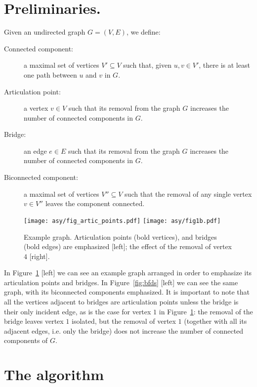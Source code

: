 \documentclass{llncs}
\begin{document}
\section{Preliminaries.}
\label{sec:prelim}
Given an undirected graph $G=(V,E)$, we define:
\begin{description}
	\item[Connected component:] a maximal set of vertices $V'\subseteq V$ such that, given $u,v\in V'$, there is at least one path between $u$ and $v$ in $G$. 
	\item[Articulation point:] a vertex $v\in V$ such that its removal from the graph $G$ increases the number of connected components in $G$. 
	\item[Bridge:] an edge $e\in E$ such that its removal from the graph $G$ increases the number of connected components in $G$. 
	\item[Biconnected component:] a maximal set of vertices $V''\subseteq V$ such that the removal of any single vertex $v\in V''$ leaves the component connected.
\end{description}

\begin{figure}[t!]
	\texttt{[image: asy/fig\_artic\_points.pdf]}\hfill \raisebox{1cm}{$\longrightarrow$} \hfill
	\texttt{[image: asy/fig1b.pdf]}
	\caption{Example graph. Articulation points (bold vertices), and bridges (bold edges) are emphasized [left]; the effect of the removal of vertex $4$ [right].\label{fig:graphccs}}
\end{figure}

In Figure~\ref{fig:graphccs} [left] we can see an example graph arranged in order to emphasize its articulation points and bridges. In Figure~\ref{fig:bfds} [left] we can see the same graph, with its biconnected components emphasized. It is important to note that all the vertices adjacent to bridges are articulation points unless the bridge is their only incident edge, as is the case for vertex $1$ in Figure~\ref{fig:graphccs}: the removal of the bridge leaves vertex $1$ isolated, but the removal of vertex $1$ (together with all its adjacent edges, i.e. only the bridge) does not increase the number of connected components of $G$.



\section{The algorithm}
\label{sec:alg}
\end{document}
